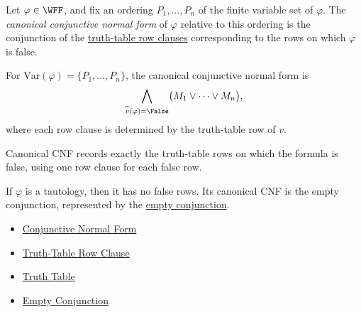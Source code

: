 \begin{tcolorbox}[colback=propbox, colframe=propborder, arc=2pt, left=6pt, right=6pt, top=4pt, bottom=4pt, title={\small\textbf{Definition (Canonical Conjunctive Normal Form)}}]
\begin{definition}
\label{def:canonical-conjunctive-normal-form-propositional-logic}
Let \(\varphi\in\WFF\), and fix an ordering \(P_1,\ldots,P_n\) of the finite
variable set of \(\varphi\). The \emph{canonical conjunctive normal form} of
\(\varphi\) relative to this ordering is the conjunction of the
\hyperref[def:truth-table-row-clause-propositional-logic]{truth-table row clauses}
corresponding to the rows on which \(\varphi\) is false.
\end{definition}
\end{tcolorbox}

\begin{remark*}
For \(\mathrm{Var}(\varphi)=\{P_1,\ldots,P_n\}\), the canonical
conjunctive normal form is
\[
\bigwedge_{\widehat v(\varphi)=\False}
\bigl(M_1\lor\cdots\lor M_n\bigr),
\]
where each row clause is determined by the truth-table row of \(v\).
\end{remark*}

\begin{remark*}[Interpretation]
Canonical CNF records exactly the truth-table rows on which the formula is
false, using one row clause for each false row.
\end{remark*}

\begin{remark*}[Examples]
If \(\varphi\) is a tautology, then it has no false rows. Its canonical CNF is
the empty conjunction, represented by the
\hyperref[def:empty-conjunction-propositional-logic]{empty conjunction}.
\end{remark*}

\begin{dependencies}
\begin{itemize}
  \item \hyperref[def:conjunctive-normal-form-propositional-logic]{Conjunctive Normal Form}
  \item \hyperref[def:truth-table-row-clause-propositional-logic]{Truth-Table Row Clause}
  \item \hyperref[def:truth-table-propositional-logic]{Truth Table}
  \item \hyperref[def:empty-conjunction-propositional-logic]{Empty Conjunction}
\end{itemize}
\end{dependencies}

